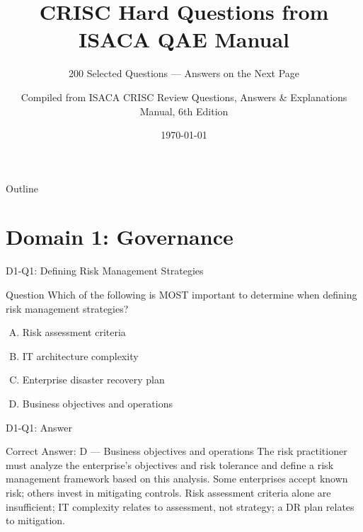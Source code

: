 \documentclass{beamer}
\title{CRISC Hard Questions from ISACA QAE Manual}
\subtitle{200 Selected Questions --- Answers on the Next Page}
\author{Compiled from ISACA CRISC Review Questions, Answers \& Explanations Manual, 6th Edition}
\date{\today}
\begin{document}
	
	\begin{frame}
		\titlepage
	\end{frame}
	
	\begin{frame}{Outline}
		\tableofcontents
	\end{frame}
	
	\section{Domain 1: Governance}
	
	\begin{frame}{D1-Q1: Defining Risk Management Strategies}
		\begin{block}{Question}
			Which of the following is MOST important to determine when defining risk management strategies?
		\end{block}
		\begin{enumerate}[(A)]
			\item Risk assessment criteria
			\item IT architecture complexity
			\item Enterprise disaster recovery plan
			\item Business objectives and operations
		\end{enumerate}
	\end{frame}
	\begin{frame}{D1-Q1: Answer}
		\begin{block}{Correct Answer: D --- Business objectives and operations}
			The risk practitioner must analyze the enterprise's objectives and risk tolerance and define a risk management framework based on this analysis. Some enterprises accept known risk; others invest in mitigating controls. Risk assessment criteria alone are insufficient; IT complexity relates to assessment, not strategy; a DR plan relates to mitigation.
		\end{block}
	\end{frame}
	
\end{document}
